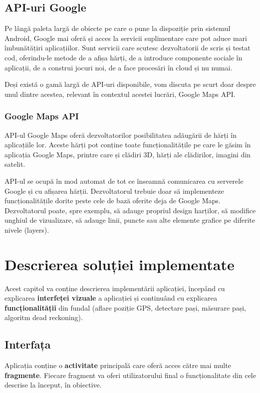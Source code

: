 \documentclass[12pt, a4paper, oneside]{article}
\begin{document}
\subsection{API-uri Google}
Pe lângă paleta largă de obiecte pe care o pune la dispoziție prin sistemul Android, Google mai oferă și acces la servicii suplimentare care pot aduce mari îmbunătățiri aplicațiilor. Sunt servicii care scutesc dezvoltatorii de scris și testat cod, oferindu-le metode de a afișa hărți, de a introduce componente sociale în aplicații, de a construi jocuri noi, de a face procesări în cloud și nu numai.

Deși există o gamă largă de API-uri disponibile, vom discuta pe scurt doar despre unul dintre acestea, relevant în contextul acestei lucrări, Google Maps API.

\subsubsection{Google Maps API \cite{GoogleMapsAndroidAPI}}
API-ul Google Maps oferă dezvoltatorilor posibilitatea adăugării de hărți în aplicațiile lor. Aceste hărți pot conține toate funcționalitățile pe care le găsim în aplicația Google Maps, printre care și clădiri 3D, hărți ale clădirilor, imagini din satelit.

API-ul se ocupă în mod automat de tot ce înseamnă comunicarea cu serverele Google și cu afișarea hărții. Dezvoltatorul trebuie doar să implementeze funcționalitățile dorite peste cele de bază oferite deja de Google Maps. Dezvoltatorul poate, spre exemplu, să adauge propriul design harților, să modifice unghiul de vizualizare, să adauge linii, puncte sau alte elemente grafice pe diferite nivele (layers).

\newpage




\newpage
\section{Descrierea soluției implementate} \label{DescriereAplicatie}
Acest capitol va conține descrierea implementării aplicației, începând cu explicarea \textbf{interfeței vizuale} a aplicației și continuând cu explicarea \textbf{funcționalității} din fundal (aflare poziție GPS, detectare pași, măsurare pași, algoritm dead reckoning).

\subsection{Interfața} \label{DescriereInterfata}
Aplicația conține o \textbf{activitate} principală care oferă acces către mai multe \textbf{fragmente}. Fiecare fragment va oferi utilizatorului final o funcționalitate din cele descrise la început, în obiective.
\end{document}
